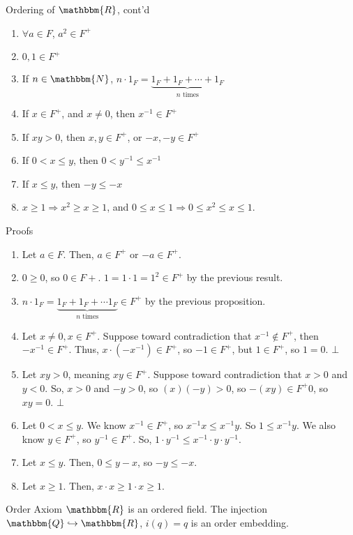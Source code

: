 \documentclass[10pt]{extarticle}
\newcommand{\N}{\mathbbm{N}}
\newcommand{\Q}{\mathbbm{Q}}
\newcommand{\R}{\mathbbm{R}}
\begin{document}
\begin{problem}{Ordering of $\R$, cont'd}
\begin{description}
    \end{description}
    \begin{enumerate}[(1)]
      \item $\forall a\in F$, $a^{2}\in F^+$
      \item $0,1\in F^+$
      \item If $n\in \N$, $n\cdot 1_{F} = \underbrace{1_F + 1_F + \cdots + 1_F}_{\text{$n$ times}}$
      \item If $x\in F^+$, and $x\neq 0$, then $x^{-1}\in F^+$
      \item If $xy > 0$, then $x,y\in F^+$, or $-x,-y\in F^{+}$
      \item If $0 < x \leq y$, then $0 < y^{-1} \leq x^{-1}$
      \item If $x\leq y$, then $-y\leq -x$
      \item $x\geq 1 \Rightarrow x^2 \geq x \geq 1$, and $0\leq x\leq 1 \Rightarrow 0 \leq x^2 \leq x \leq 1$.
    \end{enumerate}
    \begin{problem}{Proofs}
      \begin{enumerate}[(1)]
        \item Let $a\in F$. Then, $a\in F^+$ or $-a\in F^+$.
        \item $0\geq 0$, so $0\in F+$. $1 = 1\cdot 1 = 1^2 \in F^+$ by the previous result.
        \item $n\cdot 1_F = \underbrace{1_F + 1_F + \cdots 1_F}_{\text{$n$ times}}\in F^+$ by the previous proposition.
        \item Let $x\neq 0, x\in F^+$. Suppose toward contradiction that $x^{-1}\notin F^+$, then $-x^{-1}\in F^+$. Thus, $x\cdot(-x^{-1})\in F^+$, so $-1\in F^+$, but $1\in F^+$, so $1 = 0$. $\bot$
        \item Let $xy > 0$, meaning $xy\in F^+$. Suppose toward contradiction that $x>0$ and $y<0$. So, $x>0$ and $-y > 0$, so $(x)(-y) > 0$, so $-(xy) \in F^+ 0$, so $xy = 0$. $\bot$
        \item Let $0 < x \leq y$. We know $x^{-1}\in F^+$, so $x^{-1}x \leq x^{-1}y$. So $1\leq x^{-1}y$. We also know $y\in F^+$, so $y^{-1}\in F^+$. So, $1\cdot y^{-1}\leq x^{-1}\cdot y\cdot y^{-1}$. 
        \item Let $x\leq y$. Then, $0\leq y-x$, so $-y\leq -x$.
        \item Let $x\geq 1$. Then, $x\cdot x \geq 1\cdot x \geq 1$.
      \end{enumerate}
    \end{problem}
    \begin{problem}{Order Axiom}
      $\R$ is an ordered field. The injection $\Q\hookrightarrow \R$, $i(q) = q$ is an order embedding.
    \end{problem}
  \end{problem}
\end{document}
